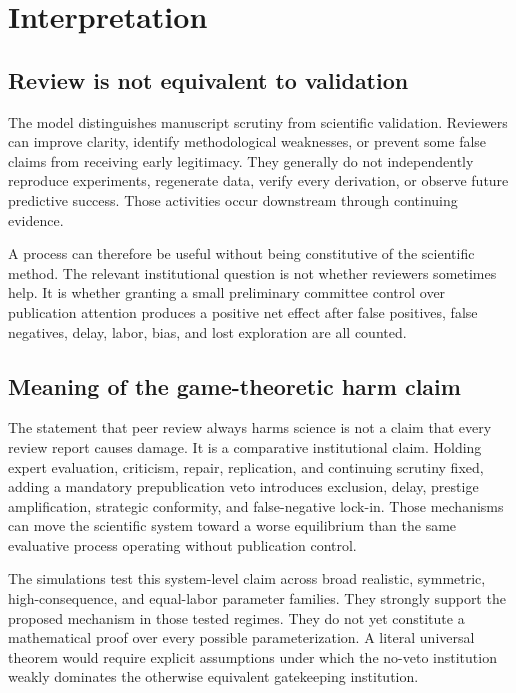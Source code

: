 \documentclass[11pt]{article}
\begin{document}
\section{Interpretation}

\subsection{Review is not equivalent to validation}

The model distinguishes manuscript scrutiny from scientific validation. Reviewers can improve clarity, identify methodological weaknesses, or prevent some false claims from receiving early legitimacy. They generally do not independently reproduce experiments, regenerate data, verify every derivation, or observe future predictive success. Those activities occur downstream through continuing evidence.

A process can therefore be useful without being constitutive of the scientific method. The relevant institutional question is not whether reviewers sometimes help. It is whether granting a small preliminary committee control over publication attention produces a positive net effect after false positives, false negatives, delay, labor, bias, and lost exploration are all counted.

\subsection{Meaning of the game-theoretic harm claim}

The statement that peer review always harms science is not a claim that every review report causes damage. It is a comparative institutional claim. Holding expert evaluation, criticism, repair, replication, and continuing scrutiny fixed, adding a mandatory prepublication veto introduces exclusion, delay, prestige amplification, strategic conformity, and false-negative lock-in. Those mechanisms can move the scientific system toward a worse equilibrium than the same evaluative process operating without publication control.

The simulations test this system-level claim across broad realistic, symmetric, high-consequence, and equal-labor parameter families. They strongly support the proposed mechanism in those tested regimes. They do not yet constitute a mathematical proof over every possible parameterization. A literal universal theorem would require explicit assumptions under which the no-veto institution weakly dominates the otherwise equivalent gatekeeping institution.
\end{document}
